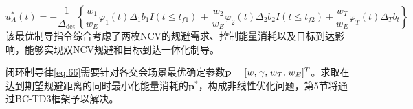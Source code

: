 \begin{equation}
\label{eq:66}
u_A^*(t) =  - \frac{1}{{{\Delta _{{\text{det}}}}}}\left\{ {\frac{{{w_1}}}{{{w_E}}}{\varphi _1}(t){\Delta _1}{b_1}I(t \leqslant {t_{f1}})} \right.{\text{ + }}\left. {\frac{{{w_2}}}{{{w_E}}}{\varphi _2}(t){\Delta _2}{b_2}I(t \leqslant {t_{f2}}) + \frac{{{w_T}}}{{{w_E}}}{\varphi _T}(t){\Delta _T}{b_t}} \right\}
\end{equation}
该最优制导指令综合考虑了两枚NCV的规避需求、控制能量消耗以及目标到达影响，能够实现双NCV规避和目标到达一体化制导。

\begin{problem}[制导参数优化]
闭环制导律\eqref{eq:66}需要针对各交会场景最优确定参数${\mathbf{p}} = {[w,{\kern 1pt} \gamma ,{\kern 1pt} {w_T},{\kern 1pt} {w_E}]^T}$。求取在达到期望规避距离的同时最小化能量消耗的${{\mathbf{p}}^*}$，构成非线性优化问题，第5节将通过BC-TD3框架予以解决。
\end{problem}
